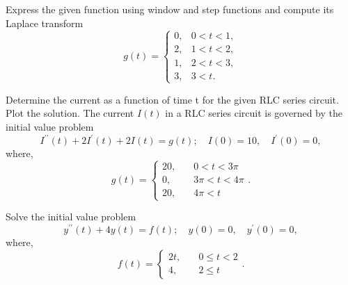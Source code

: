 \documentclass[11pt]{article}
\begin{document}
\makelabtitle




\begin{problem}
Express the given function using window and step functions and compute its Laplace transform
\begin{equation*}
g(t) = \begin{cases}
0, & 0<t<1, \\
2, & 1<t<2, \\
1, & 2<t<3, \\
3, & 3<t.
\end{cases}
\end{equation*}
\end{problem}




\begin{problem}
Determine the current as a function of time t for the given RLC series circuit. Plot the solution. The current $I(t)$ in a RLC series circuit is governed by the initial value problem
\begin{equation*}
I^{\prime \prime}(t)+2I^{\prime}(t) +2I(t)=g(t); \quad I(0)=10, \quad I^{\prime}(0) = 0,
\end{equation*}
where,
\begin{equation*}
g(t) = \begin{cases} 
20, &\quad 0<t<3\pi \\
0, &\quad 3\pi<t<4\pi \\
20, &\quad 4\pi<t
\end{cases}.
\end{equation*}
\end{problem}






\begin{problem}
Solve the initial value problem
\begin{equation*}
y^{\prime \prime}(t)+4y(t)=f(t); \quad y(0)=0, \quad y^{\prime}(0) = 0,
\end{equation*}
where,
\begin{equation*}
f(t) = \begin{cases} 
2t, &\quad 0\leq t<2 \\
4, &\quad 2 \leq t 
\end{cases}.
\end{equation*}
\end{problem}
\end{document}

